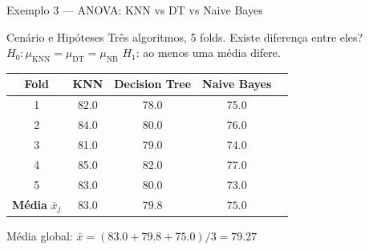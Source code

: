 \documentclass[aspectratio=169]{beamer}
\begin{document}
\begin{frame}[shrink=6]{Exemplo 3 — ANOVA: KNN vs DT vs Naive Bayes}
    \begin{block}{Cenário e Hipóteses}
        \footnotesize
        Três algoritmos, 5 folds. Existe diferença entre eles?\\
        $H_0: \mu_{\text{KNN}} = \mu_{\text{DT}} = \mu_{\text{NB}}$ \quad $H_1$: ao menos uma média difere.
    \end{block}
    \pause
    \begin{center}\footnotesize
    \begin{tabular}{ccccc}
    \toprule
    Fold & KNN & Decision Tree & Naive Bayes \\
    \midrule
    1 & 82{.}0 & 78{.}0 & 75{.}0 \\
    2 & 84{.}0 & 80{.}0 & 76{.}0 \\
    3 & 81{.}0 & 79{.}0 & 74{.}0 \\
    4 & 85{.}0 & 82{.}0 & 77{.}0 \\
    5 & 83{.}0 & 80{.}0 & 73{.}0 \\
    \midrule
    \textbf{Média} $\bar{x}_j$ & $83{.}0$ & $79{.}8$ & $75{.}0$ \\
    \bottomrule
    \end{tabular}
    \end{center}
    \pause
    \begin{block}{}
        \footnotesize Média global: $\bar{x} = (83{.}0 + 79{.}8 + 75{.}0)/3 = 79{.}27$
    \end{block}
\end{frame}
\end{document}
